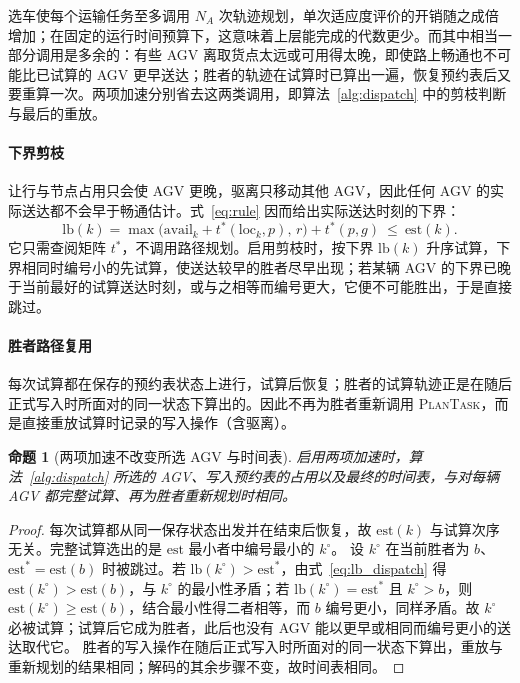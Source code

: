 \documentclass[manuscript,screen,review]{acmart}
\newtheorem{prop}{命题}
\begin{document}
选车使每个运输任务至多调用 $N_A$ 次轨迹规划，单次适应度评价的开销随之成倍增加；在固定的运行时间预算下，这意味着上层能完成的代数更少。而其中相当一部分调用是多余的：有些 AGV 离取货点太远或可用得太晚，即使路上畅通也不可能比已试算的 AGV 更早送达；胜者的轨迹在试算时已算出一遍，恢复预约表后又要重算一次。两项加速分别省去这两类调用，即算法~\ref{alg:dispatch} 中的剪枝判断与最后的重放。

\paragraph{下界剪枝}
让行与节点占用只会使 AGV 更晚，驱离只移动其他 AGV，因此任何 AGV 的实际送达都不会早于畅通估计。式~\eqref{eq:rule} 因而给出实际送达时刻的下界：
\begin{equation}
\label{eq:lb_dispatch}
\mathrm{lb}(k)=\max\bigl(\mathrm{avail}_k+t^{*}(\mathrm{loc}_k,p),\,
r\bigr)+t^{*}(p,g)\ \le\ \mathrm{est}(k).
\end{equation}
它只需查阅矩阵 $t^{*}$，不调用路径规划。启用剪枝时，按下界 $\mathrm{lb}(k)$ 升序试算，下界相同时编号小的先试算，使送达较早的胜者尽早出现；若某辆 AGV 的下界已晚于当前最好的试算送达时刻，或与之相等而编号更大，它便不可能胜出，于是直接跳过。

\paragraph{胜者路径复用}
每次试算都在保存的预约表状态上进行，试算后恢复；胜者的试算轨迹正是在随后正式写入时所面对的同一状态下算出的。因此不再为胜者重新调用 \textsc{PlanTask}，而是直接重放试算时记录的写入操作（含驱离）。

\begin{prop}[两项加速不改变所选 AGV 与时间表]
\label{prop:speedup_equiv}
启用两项加速时，算法~\ref{alg:dispatch} 所选的 AGV、写入预约表的占用以及最终的时间表，与对每辆 AGV 都完整试算、再为胜者重新规划时相同。
\end{prop}

\begin{proof}
  每次试算都从同一保存状态出发并在结束后恢复，故 $\mathrm{est}(k)$ 与试算次序无关。完整试算选出的是 $\mathrm{est}$ 最小者中编号最小的 $k^{\circ}$。
  设 $k^{\circ}$ 在当前胜者为 $b$、$\mathrm{est}^{*}=\mathrm{est}(b)$ 时被跳过。若 $\mathrm{lb}(k^{\circ})>\mathrm{est}^{*}$，由式~\eqref{eq:lb_dispatch} 得 $\mathrm{est}(k^{\circ})>\mathrm{est}(b)$，与 $k^{\circ}$ 的最小性矛盾；若 $\mathrm{lb}(k^{\circ})=\mathrm{est}^{*}$ 且 $k^{\circ}>b$，则 $\mathrm{est}(k^{\circ})\ge\mathrm{est}(b)$，结合最小性得二者相等，而 $b$ 编号更小，同样矛盾。故 $k^{\circ}$ 必被试算；试算后它成为胜者，此后也没有 AGV 能以更早或相同而编号更小的送达取代它。
  胜者的写入操作在随后正式写入时所面对的同一状态下算出，重放与重新规划的结果相同；解码的其余步骤不变，故时间表相同。
\end{proof}
\end{document}
